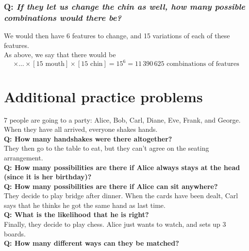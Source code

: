 \documentclass{article}
\begin{document}
\subsubsection*{Q: {\em If they let us change the chin as well, how many possible combinations would there be?}}
We would then have 6 features to change, and 15 variations of each of these features.\\
As above, we say that there would be
\begin{equation*}
[15\text{ head \& shoulders}]\times\ldots\times[15\text{ mouth}]\times[15\text{ chin}]=15^6=11\,390\,625\text{ combinations of features}
\end{equation*}

\section{\sc Additional practice problems}

7 people are going to a party: Alice, Bob, Carl, Diane, Eve, Frank, and George.\\
When they have all arrived, everyone shakes hands.\\
{\bf Q: How many handshakes were there altogether?}\\[1em]
They then go to the table to eat, but they can't agree on the seating arrangement.\\
{\bf Q: How many possibilities are there if Alice always stays at the head (since it is her birthday)?}\\[1ex]
{\bf Q: How many possibilities are there if Alice can sit anywhere?}\\[1em]
They decide to play bridge after dinner. When the cards have been dealt, Carl says that he thinks he got the same hand as last time.\\
{\bf Q: What is the likelihood that he is right?}\\[1em]
Finally, they decide to play chess. Alice just wants to watch, and sets up 3 boards.\\
{\bf Q: How many different ways can they be matched?}
\end{document}
